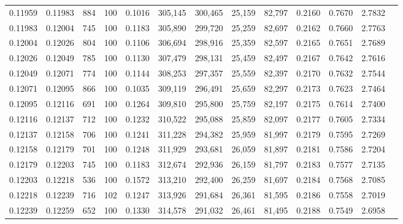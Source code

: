 \begin{tabular}{rrrrrrrrrrrrr}
0.11959 & 0.11983 &   884 & 100 &                                     0.1016 & 305,145 & 300,465 &  25,159 &  82,797 & 0.2160 & 0.7670 & 2.7832 \\
0.11983 & 0.12004 &   745 & 100 &                                     0.1183 & 305,890 & 299,720 &  25,259 &  82,697 & 0.2162 & 0.7660 & 2.7763 \\
0.12004 & 0.12026 &   804 & 100 &                                     0.1106 & 306,694 & 298,916 &  25,359 &  82,597 & 0.2165 & 0.7651 & 2.7689 \\
0.12026 & 0.12049 &   785 & 100 &                                     0.1130 & 307,479 & 298,131 &  25,459 &  82,497 & 0.2167 & 0.7642 & 2.7616 \\
0.12049 & 0.12071 &   774 & 100 &                                     0.1144 & 308,253 & 297,357 &  25,559 &  82,397 & 0.2170 & 0.7632 & 2.7544 \\
0.12071 & 0.12095 &   866 & 100 &                                     0.1035 & 309,119 & 296,491 &  25,659 &  82,297 & 0.2173 & 0.7623 & 2.7464 \\
0.12095 & 0.12116 &   691 & 100 &                                     0.1264 & 309,810 & 295,800 &  25,759 &  82,197 & 0.2175 & 0.7614 & 2.7400 \\
0.12116 & 0.12137 &   712 & 100 &                                     0.1232 & 310,522 & 295,088 &  25,859 &  82,097 & 0.2177 & 0.7605 & 2.7334 \\
0.12137 & 0.12158 &   706 & 100 &                                     0.1241 & 311,228 & 294,382 &  25,959 &  81,997 & 0.2179 & 0.7595 & 2.7269 \\
0.12158 & 0.12179 &   701 & 100 &                                     0.1248 & 311,929 & 293,681 &  26,059 &  81,897 & 0.2181 & 0.7586 & 2.7204 \\
0.12179 & 0.12203 &   745 & 100 &                                     0.1183 & 312,674 & 292,936 &  26,159 &  81,797 & 0.2183 & 0.7577 & 2.7135 \\
0.12203 & 0.12218 &   536 & 100 &                                     0.1572 & 313,210 & 292,400 &  26,259 &  81,697 & 0.2184 & 0.7568 & 2.7085 \\
0.12218 & 0.12239 &   716 & 102 &                                     0.1247 & 313,926 & 291,684 &  26,361 &  81,595 & 0.2186 & 0.7558 & 2.7019 \\
0.12239 & 0.12259 &   652 & 100 &                                     0.1330 & 314,578 & 291,032 &  26,461 &  81,495 & 0.2188 & 0.7549 & 2.6958 \\

\end{tabular}
